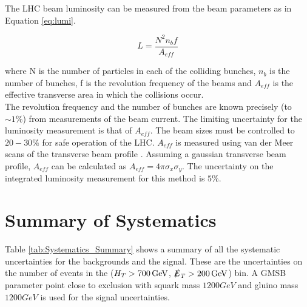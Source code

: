 The LHC beam luminosity can be measured from the beam parameters as in Equation
\ref{eq:lumi}.

\begin{equation}
L = \frac{N^{2}n_{b}f}{A_{eff}}
\label{eq:lumi}
\end{equation}

where N is the number of particles in each of the colliding bunches, $n_{b}$ is
the number of bunches, f is the revolution frequency of the beams and $A_{eff}$
is the effective transverse area in which the collisions occur. \\

The revolution frequency and the number of bunches are known precisely (to $\sim
1\unit{\%}$) from measurements of the beam current. The limiting uncertainty for 
the luminosity measurement is that of $A_{eff}$. The beam sizes must be 
controlled to $20-30\unit{\%}$ for safe operation of the LHC. $A_{eff}$ is 
measured using van der Meer scans of the transverse beam profile 
\cite{vdm_scans}. Assuming a gaussian transverse beam profile, $A_{eff}$ can be 
calculated as $A_{eff} = 4\pi\sigma_{x}\sigma_{y}$. The uncertainty on the 
integrated luminosity measurement for this method is $5\unit{\%}$. \\

\section{Summary of Systematics}

Table \ref{tab:Systematics_Summary} shows a summary of all the systematic
uncertainties for the backgrounds and the signal. These are the uncertainties on
the number of events in the ($H_{T}>700\, \mathrm{GeV}$, $\slashed{E}_{T}>200\, \mathrm{GeV}$) bin. A
GMSB parameter point close to exclusion with squark mass $1200\unit{GeV}$ and 
gluino mass $1200\unit{GeV}$ is used for the signal uncertainties.


